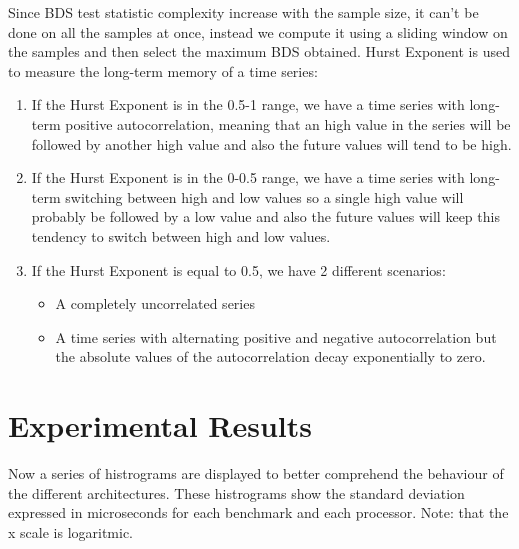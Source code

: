 Since BDS test statistic complexity increase with the sample size, it can't be done on all the samples at once, instead we compute it using a sliding window on the samples and then select the maximum BDS obtained.\newline
Hurst Exponent is used to measure the long-term memory of a time series:
\begin{enumerate}
	\item If the Hurst Exponent is in the 0.5-1 range, we have a time series with long-term positive autocorrelation, meaning that an high value in the series will be followed by another high value and also the future values will tend to be high.
	\item If the Hurst Exponent is in the 0-0.5 range, we have a time series with long-term switching between high and low values so a single high value will probably be followed by a low value and also the future values will keep this tendency to switch between high and low values.
	\item If the Hurst Exponent is equal to 0.5, we have 2 different scenarios:
	\begin{itemize}
		\item A completely uncorrelated series
		\item A time series with alternating positive and negative autocorrelation but the absolute values of the autocorrelation decay exponentially to zero.
	\end{itemize}
\end{enumerate}



\section{Experimental Results}
Now a series of histrograms are displayed to better comprehend the behaviour of the different architectures.
These histrograms show the standard deviation expressed in microseconds for each benchmark and each processor.
Note: that the x scale is logaritmic.\newline

